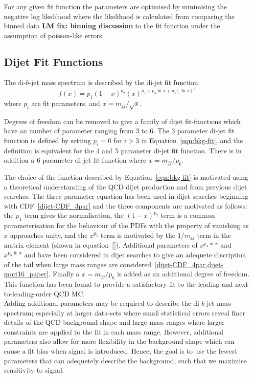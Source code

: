 For any given fit function the parameters are optimised
by minimising the negative log likelihood where
the likelihood is calculated from comparing
the binned data \textbf{LM fix: binning discussion} to the fit function
under the assumption of poisson-like errors.

\subsection{Dijet Fit Functions}
\label{sec:bkg-bkg_func}

The di-$b$-jet mass spectrum is described by the di-jet fit function:
\begin{equation}
  f(x)=p_1(1-x)^{p_2}(x)^{p_3+p_4\ln{x}+p_5(\ln{x})^{2}}
\label{eqn:bkg-fit}
\end{equation}
where $p_i$ are fit parameters, and $x=m_{jj}/\sqrt{s}$.

Degrees of freedom can be removed to give a family of dijet fit-functions which have an number of parameter ranging from 3 to 6.
The 3 parameter di-jet fit function is defined by setting $p_{i} = 0$ for $i > 3$ in Equation~\ref{eqn:bkg-fit},
and the definition is equivalent for the 4 and 5 parameter di-jet fit function.
There is in addition a 6 parameter di-jet fit function where $x=m_{jj}/p_6$.

The choice of the function described by Equation~\ref{eqn:bkg-fit}
is motivated using a theoretical understanding of the QCD dijet production
and from previous dijet searches.
The three parameter equation has been used in dijet searches beginning with CDF~\ref{dijet-CDF_3par}
and the three components are motivated as follows:
the $p_1$ term gives the normalisation,
the $(1-x)^{p_2}$ term is a common parameterisation for the behaviour of the PDFs with the property of vanishing as $x$ approaches unity,
and the $x^{p_3}$ term is motivated by the $1/m_{jj}$ term in the matrix element (shown in equation~\ref{}).
Additional parameters of $x^{p_4\ln{x}}$ and $x^{p_5\ln{x}}$ and have been considered in dijet searches to give an adequete discription of the tail
when large mass ranges are considered~\ref{dijet-CDF_4par,dijet-mori16_paper}.
Finally a $x=m_{jj}/p_6$ is added as an additional degree of freedom.
This function has been found to provide a satisfactory fit to the leading and next-to-leading-order QCD MC.\\

Adding additional parameters may be required to describe the di-$b$-jet mass spectrum;
especially at larger data-sets where small statistical errors reveal finer details of the QCD background shape
and large mass ranges where larger constraints are applied to the fit in each mass range.
However, additional parameters also allow for more flexibility in the background shape
which can cause a fit bias when signal is introduced.
Hence, the goal is to use the fewest parameters that can adequetely describe the background,
such that we maximise sensitivity to signal.

